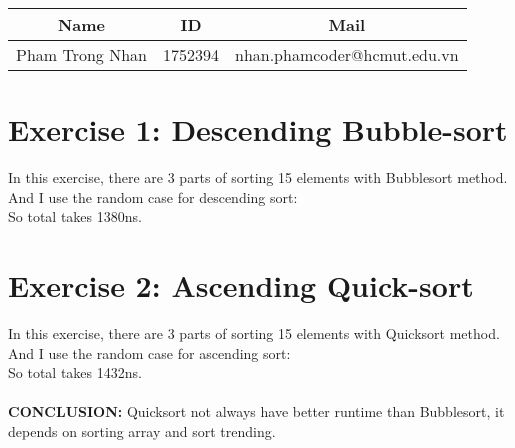 \documentclass[a4paper, 12pt]{article}
\author{Pham Trong Nhan - 1752394}
\begin{document}
    \begin{tabular}{|c|c|c|}
        \hline
            Name & ID & Mail\\
        \hline
            Pham Trong Nhan & 1752394 & nhan.phamcoder@hcmut.edu.vn\\
        \hline
    \end{tabular}

    \section*{Exercise 1: Descending Bubble-sort}
        In this exercise, there are 3 parts of sorting 15 elements with Bubblesort method.
        And I use the random case for descending sort:\\
        So total takes 1380ns.

    \section*{Exercise 2: Ascending Quick-sort}
        In this exercise, there are 3 parts of sorting 15 elements with Quicksort method.
        And I use the random case for ascending sort:\\
        So total takes 1432ns.\\\\

    \textbf{CONCLUSION: }Quicksort not always have better runtime than Bubblesort, it depends on sorting array and sort trending.
\end{document}
